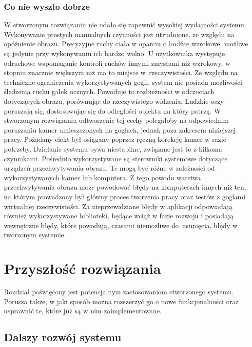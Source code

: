 \documentclass[a4paper,11pt,twoside]{report}
\theoremstyle{definition}
\begin{document}
\subsection{Co nie wyszło dobrze}

W stworzonym rozwiązaniu nie udało się zapewnić wysokiej wydajności systemu. Wykonywanie prostych manualnych czynności jest utrudnione, ze względu na opóźnienie obrazu. Precyzyjne ruchy ciała w oparciu o bodźce wzrokowe, możliwe są jedynie przy wykonywaniu ich bardzo wolno. U użytkownika występuje odruchowe wspomaganie kontroli ruchów innymi zmysłami niż wzrokowy, w stopniu znacznie większym niż ma to miejsce w~rzeczywistości. Ze względu na techniczne ograniczenia wykorzystywanych gogli, system nie posiada możliwości śledzenia ruchu gałek ocznych. Powoduje to rozbieżności w odczuciach dotyczących obrazu, porównując do rzeczywistego widzenia. Ludzkie oczy poruszają się, dostosowując się do odległości obiektu na który patrzą. W stworzonym rozwiązaniu odtworzenie tej cechy polegałoby na odpowiednim poruszaniu kamer umieszczonych na goglach, jednak poza zakresem niniejszej pracy. Pożądany efekt był osiągany poprzez ręczną korekcję kamer w razie potrzeby. Działanie systemu bywa niestabilne, związane jest to z kilkoma czynnikami. Pośrednio wykorzystywane są sterowniki systemowe dotyczące urządzeń przechwytywania obrazu. Te mogą być różne w zależności od wykorzystywanych kamer lub komputera. Z tego powodu warstwa przechwytywania obrazu może powodować błędy na komputerach innych niż ten, na którym prowadzony był główny proces tworzenia pracy oraz testów z goglami wirtualnej rzeczywistości. Za nieprzewidziane błędy w aplikacji odpowiadają również wykorzystywane biblioteki, będące wciąż w fazie rozwoju i posiadają wewnętrzne błędy, które powodują, czasami niemożliwe do~usunięcia, błędy w tworzonym systemie.

\chapter{Przyszłość rozwiązania}

Rozdział poświęcony jest potencjalnym zastosowaniom stworzonego systemu. Porusza także, w jaki sposób można rozszerzyć go o nowe funkcjonalności oraz usprawnić te, które już są w nim zaimplementowane.

\section{Dalszy rozwój systemu}
\end{document}
